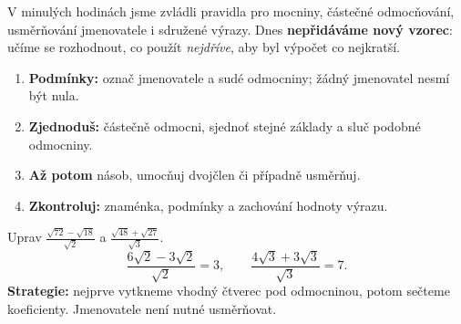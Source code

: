 \documentclass[11pt,a4paper]{article}
\begin{document}

V minulých hodinách jsme zvládli pravidla pro mocniny, částečné
odmocňování, usměrňování jmenovatele i sdružené výrazy.
Dnes \textbf{nepřidáváme nový vzorec}: učíme se rozhodnout, co použít
\emph{nejdříve}, aby byl výpočet co nejkratší.

\begin{definiceBox}[title={Postup - Zjednodušování složených výrazů}]
\begin{enumerate}[label=\arabic*.]
\item \textbf{Podmínky:} označ jmenovatele a sudé odmocniny; žádný jmenovatel nesmí být nula.
\item \textbf{Zjednoduš:} částečně odmocni, sjednoť stejné základy a sluč podobné odmocniny.
\item \textbf{Až potom} násob, umocňuj dvojčlen či případně usměrňuj.
\item \textbf{Zkontroluj:} znaménka, podmínky a zachování hodnoty výrazu.
\end{enumerate}
\end{definiceBox}

\begin{prikladReseniBox}[breakable=false,title={Příklad 1}]
Uprav $\displaystyle\frac{\sqrt{72}-\sqrt{18}}{\sqrt2}$ a
$\displaystyle\frac{\sqrt{48}+\sqrt{27}}{\sqrt3}$.
\tcblower
\[
\frac{6\sqrt2-3\sqrt2}{\sqrt2}=\boxed{3},\qquad
\frac{4\sqrt3+3\sqrt3}{\sqrt3}=\boxed{7}.
\]
\textbf{Strategie:} nejprve vytkneme vhodný čtverec pod odmocninou,
potom sečteme koeficienty. Jmenovatele není nutné usměrňovat.
\end{prikladReseniBox}
\end{document}
